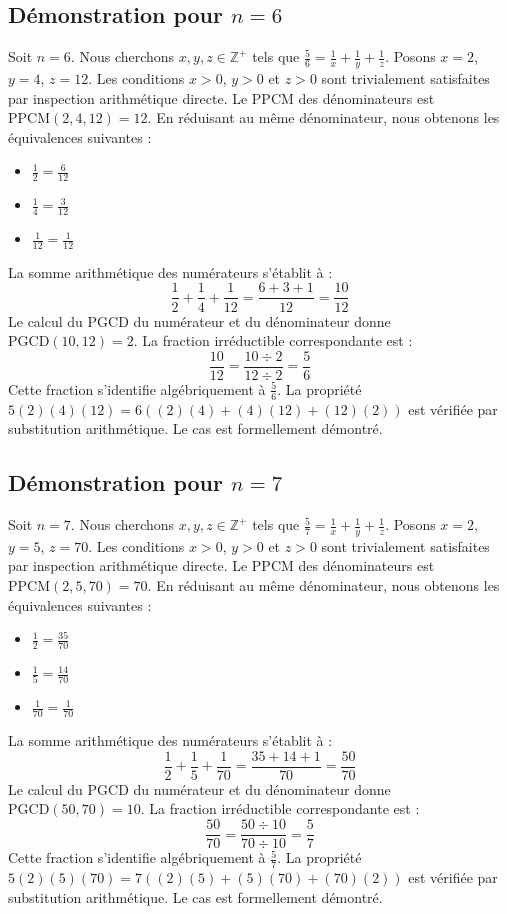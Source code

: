 \documentclass[12pt,a4paper]{article}
\begin{document}
\subsection{Démonstration pour $n = 6$}
Soit $n = 6$. Nous cherchons $x, y, z \in \mathbb{Z}^{+}$ tels que $\frac{5}{6} = \frac{1}{x} + \frac{1}{y} + \frac{1}{z}$.
Posons $x = 2$, $y = 4$, $z = 12$.
Les conditions $x > 0$, $y > 0$ et $z > 0$ sont trivialement satisfaites par inspection arithmétique directe.
Le PPCM des dénominateurs est $\text{PPCM}(2, 4, 12) = 12$.
En réduisant au même dénominateur, nous obtenons les équivalences suivantes :
\begin{itemize}
    \item $\frac{1}{2} = \frac{6}{12}$
    \item $\frac{1}{4} = \frac{3}{12}$
    \item $\frac{1}{12} = \frac{1}{12}$
\end{itemize}
La somme arithmétique des numérateurs s'établit à :
$$ \frac{1}{2} + \frac{1}{4} + \frac{1}{12} = \frac{6 + 3 + 1}{12} = \frac{10}{12} $$
Le calcul du PGCD du numérateur et du dénominateur donne $\text{PGCD}(10, 12) = 2$.
La fraction irréductible correspondante est :
$$ \frac{10}{12} = \frac{10 \div 2}{12 \div 2} = \frac{5}{6} $$
Cette fraction s'identifie algébriquement à $\frac{5}{6}$.
La propriété $5(2)(4)(12) = 6((2)(4) + (4)(12) + (12)(2))$ est vérifiée par substitution arithmétique.
Le cas est formellement démontré.

\subsection{Démonstration pour $n = 7$}
Soit $n = 7$. Nous cherchons $x, y, z \in \mathbb{Z}^{+}$ tels que $\frac{5}{7} = \frac{1}{x} + \frac{1}{y} + \frac{1}{z}$.
Posons $x = 2$, $y = 5$, $z = 70$.
Les conditions $x > 0$, $y > 0$ et $z > 0$ sont trivialement satisfaites par inspection arithmétique directe.
Le PPCM des dénominateurs est $\text{PPCM}(2, 5, 70) = 70$.
En réduisant au même dénominateur, nous obtenons les équivalences suivantes :
\begin{itemize}
    \item $\frac{1}{2} = \frac{35}{70}$
    \item $\frac{1}{5} = \frac{14}{70}$
    \item $\frac{1}{70} = \frac{1}{70}$
\end{itemize}
La somme arithmétique des numérateurs s'établit à :
$$ \frac{1}{2} + \frac{1}{5} + \frac{1}{70} = \frac{35 + 14 + 1}{70} = \frac{50}{70} $$
Le calcul du PGCD du numérateur et du dénominateur donne $\text{PGCD}(50, 70) = 10$.
La fraction irréductible correspondante est :
$$ \frac{50}{70} = \frac{50 \div 10}{70 \div 10} = \frac{5}{7} $$
Cette fraction s'identifie algébriquement à $\frac{5}{7}$.
La propriété $5(2)(5)(70) = 7((2)(5) + (5)(70) + (70)(2))$ est vérifiée par substitution arithmétique.
Le cas est formellement démontré.
\end{document}
